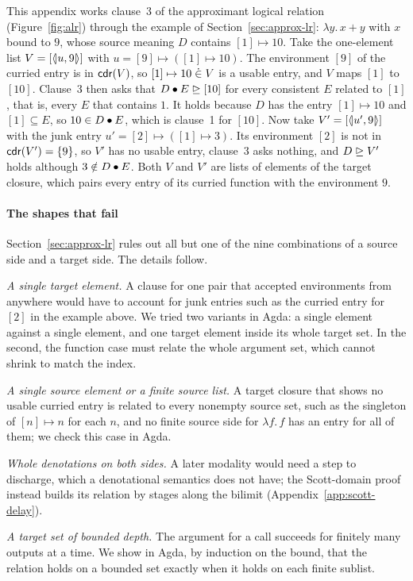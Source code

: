 This appendix works clause~3 of the approximant logical relation (Figure~\ref{fig:alr}) through the example of Section~\ref{sec:approx-lr}: $\lambda y.\, x + y$ with $x$ bound to $9$, whose source meaning $D$ contains $[1] \mapsto 10$. Take the one-element list
$V = [\langle\!|u,9|\!\rangle]$ with $u = [9] \mapsto ([1] \mapsto 10)$. The
environment $[9]$ of the curried entry is in $\mathsf{cdr}(V)$, so
$[1] \mapsto 10 \mathrel{\dot{\in}} V$ is a usable entry, and $V$ maps $[1]$ to $[10]$. Clause~3 then asks that $D \mathbin{\bullet} E \mathrel{\trianglerighteq} [10]$ for
every consistent $E$ related to $[1]$, that is, every $E$ that
contains $1$. It holds because $D$ has the entry $[1] \mapsto 10$ and
$[1] \subseteq E$, so $10 \in D \mathbin{\bullet} E$, which is clause~1 for
$[10]$. Now take $V' = [\langle\!|u',9|\!\rangle]$ with the junk entry
$u' = [2] \mapsto ([1] \mapsto 3)$. Its environment $[2]$ is not in
$\mathsf{cdr}(V') = \{9\}$, so $V'$ has no usable entry, clause~3 asks
nothing, and $D \mathrel{\trianglerighteq} V'$ holds although $3 \notin D \mathbin{\bullet} E$. Both
$V$ and $V'$ are lists of elements of the target closure, which pairs
every entry of its curried function with the environment $9$.

\paragraph{The shapes that fail}

Section~\ref{sec:approx-lr} rules out all but one of the nine
combinations of a source side and a target side. The details follow.

\emph{A single target element.} A clause for one pair that accepted
environments from anywhere would have to account for junk entries such
as the curried entry for $[2]$ in the example above. We tried two
variants in Agda: a single element against a single element, and one
target element inside its whole target set. In the second, the
function case must relate the whole argument set, which cannot shrink
to match the index.

\emph{A single source element or a finite source list.} A target
closure that shows no usable curried entry is related to every nonempty
source set, such as the singleton of $[n] \mapsto n$ for each $n$, and
no finite source side for $\lambda f.\,f$ has an entry for all of them;
we check this case in Agda.

\emph{Whole denotations on both sides.} A later modality would need a
step to discharge, which a denotational semantics does not have; the
Scott-domain proof instead builds its relation by stages along the
bilimit (Appendix~\ref{app:scott-delay}).

\emph{A target set of bounded depth.} The argument for a call succeeds
for finitely many outputs at a time. We show in Agda, by induction on
the bound, that the relation holds on a bounded set exactly when it
holds on each finite sublist.
